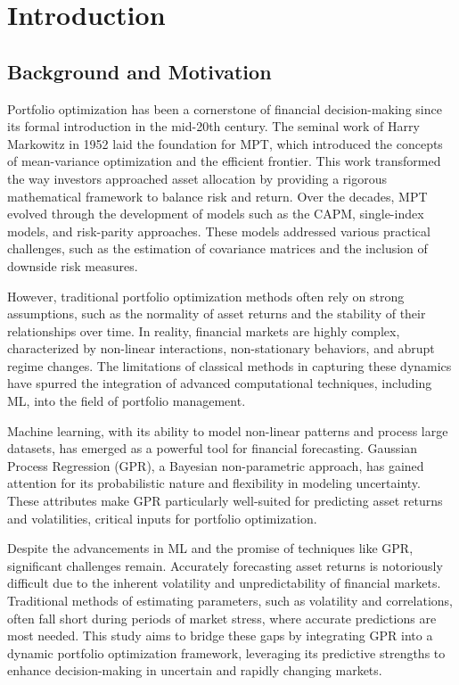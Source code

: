 
\chapter{Introduction}\label{chapter:introduction}

\section{Background and Motivation}
Portfolio optimization has been a cornerstone of financial decision-making since its formal introduction in the mid-20th century. The seminal work of Harry Markowitz in 1952 laid the foundation for \ac{MPT}, which introduced the concepts of mean-variance optimization and the efficient frontier. This work transformed the way investors approached asset allocation by providing a rigorous mathematical framework to balance risk and return. Over the decades, \ac{MPT} evolved through the development of models such as the \ac{CAPM}, single-index models, and risk-parity approaches. These models addressed various practical challenges, such as the estimation of covariance matrices and the inclusion of downside risk measures.

However, traditional portfolio optimization methods often rely on strong assumptions, such as the normality of asset returns and the stability of their relationships over time. In reality, financial markets are highly complex, characterized by non-linear interactions, non-stationary behaviors, and abrupt regime changes. The limitations of classical methods in capturing these dynamics have spurred the integration of advanced computational techniques, including \ac{ML}, into the field of portfolio management.

Machine learning, with its ability to model non-linear patterns and process large datasets, has emerged as a powerful tool for financial forecasting. Gaussian Process Regression (GPR), a Bayesian non-parametric approach, has gained attention for its probabilistic nature and flexibility in modeling uncertainty. These attributes make \ac{GPR} particularly well-suited for predicting asset returns and volatilities, critical inputs for portfolio optimization.

Despite the advancements in \ac{ML} and the promise of techniques like \ac{GPR}, significant challenges remain. Accurately forecasting asset returns is notoriously difficult due to the inherent volatility and unpredictability of financial markets. Traditional methods of estimating parameters, such as volatility and correlations, often fall short during periods of market stress, where accurate predictions are most needed. This study aims to bridge these gaps by integrating \ac{GPR} into a dynamic portfolio optimization framework, leveraging its predictive strengths to enhance decision-making in uncertain and rapidly changing markets.

